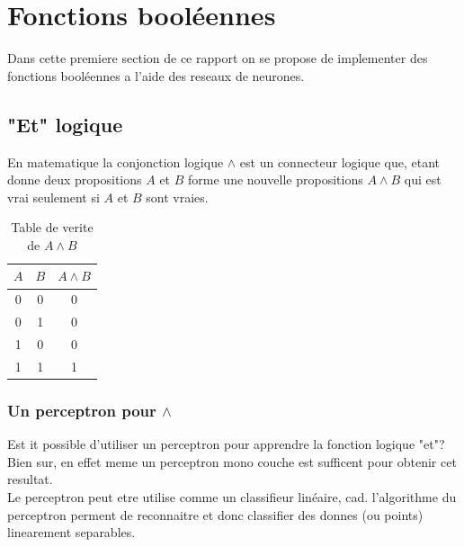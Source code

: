 \documentclass[twoside,openright,a4paper,11pt,french]{article}
\begin{document}
\pagestyle{plain}
\setlength{\parindent}{0pt}



\parskip=0pt
\tableofcontents


\vspace{5cm}


\section{Fonctions booléennes}

Dans cette premiere section de ce rapport on se propose
de implementer des fonctions booléennes a l'aide des reseaux
de neurones. 

\subsection{"Et" logique}

En matematique la conjonction logique $\land$ est un
connecteur logique que, etant donne deux propositions $A$ et $B$
forme une nouvelle propositions $A \land B$ qui est vrai seulement
si $A$ et $B$ sont vraies.

\begin{table}[h]
  \centering
  \begin{tabular}{| c | c | c |}
    \hline
    \textbf{$A$} & \textbf{$B$} & \textbf{$A \land B$}\\
    \hline
    0 & 0  & 0 \\
    \hline
    0 & 1  & 0 \\
    \hline
    1 & 0  & 0 \\
    \hline
    1 & 1  & 1 \\
    \hline
  \end{tabular}
  \caption{Table de verite de $A \land B$}
  \label{tab:et}
\end{table}




\subsubsection{Un perceptron pour $\land$} 

Est it possible d'utiliser un perceptron pour apprendre la fonction logique
"et"? Bien sur, en effet meme un perceptron mono couche est sufficent pour
obtenir cet resultat.\\

Le perceptron peut etre utilise comme un classifieur linéaire, cad. l'algorithme du
perceptron perment de reconnaitre et donc classifier des donnes (ou points)
linearement separables.\\
\end{document}
